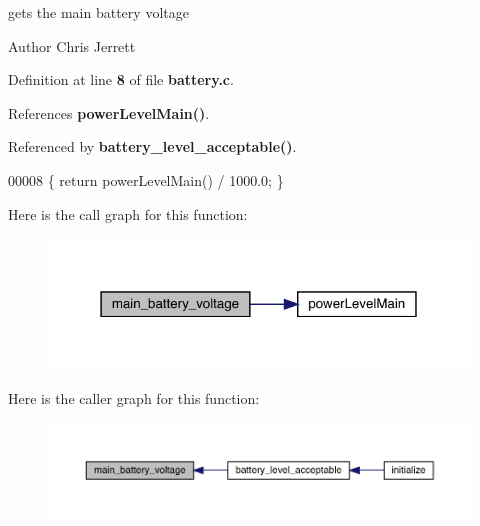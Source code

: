 gets the main battery voltage 

\begin{DoxyAuthor}{Author}
Chris Jerrett 
\end{DoxyAuthor}


Definition at line \textbf{ 8} of file \textbf{ battery.\+c}.



References \textbf{ power\+Level\+Main()}.



Referenced by \textbf{ battery\+\_\+level\+\_\+acceptable()}.


\begin{DoxyCode}
00008 \{ \textcolor{keywordflow}{return} powerLevelMain() / 1000.0; \}
\end{DoxyCode}
Here is the call graph for this function\+:
\nopagebreak
\begin{figure}[H]
\begin{center}
\leavevmode
\includegraphics[width=316pt]{battery_8h_a8c92c389534fdb079698cdebeb7f2efa_cgraph}
\end{center}
\end{figure}
Here is the caller graph for this function\+:
\nopagebreak
\begin{figure}[H]
\begin{center}
\leavevmode
\includegraphics[width=350pt]{battery_8h_a8c92c389534fdb079698cdebeb7f2efa_icgraph}
\end{center}
\end{figure}
